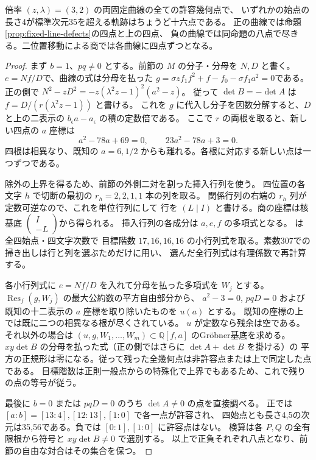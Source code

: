 \begin{theorem}\label{thm:fixed-geometric-quartic}
倍率 $(z,\lambda)=(3,2)$ の両固定曲線の全ての許容幾何点で、
いずれかの始点の長さ4が標準次元35を超える軌跡はちょうど十六点である。
正の曲線では命題\ref{prop:fixed-line-defects}の四点と上の四点、
負の曲線では同命題の八点で尽きる。二位置移動による商では各曲線に四点ずつとなる。
\end{theorem}
\begin{proof}
まず $b=1$、$pq\ne0$ とする。前節の $M$ の分子・分母を $N,D$ と書く。
$e=Nf/D$で、曲線の式は分母を払った
$g=\sigma z f_1 f^2+f-f_0-\sigma f_1 a^2=0$である。
正の側で $N^2-zD^2=-z(\lambda^2z-1)^2(a^2-z)$。
従って $\det B=-\det A$ は $f=D/(r(\lambda^2 z-1))$ と書ける。
これを $g$ に代入し分子を因数分解すると、$D$ と上の二表示の
$b_\epsilon a-a_\epsilon$ の積の定数倍である。
ここで $r$ の両根を取ると、新しい四点の $a$ 座標は
\[
 a^2-78a+69=0,\qquad 23a^2-78a+3=0.
\]
四根は相異なり、既知の $a=6,1/2$ からも離れる。各根に対応する新しい点は一つずつである。

除外の上界を得るため、前節の外側二対を割った挿入行列を使う。
四位置の各文字 $h$ で切断の最初の $r_h=2,2,1,1$ 本の列を取る。
関係行列の右端の $r_h$ 列が定数可逆なので、これを単位行列にして
行を $(L\mid I)$ と書ける。商の座標は核基底 $\left(\begin{smallmatrix}I\\-L\end{smallmatrix}\right)$から得られる。
挿入行列の各成分は $a,e,f$ の多項式となる。
 は全四始点・四文字次数で
目標階数 $17,16,16,16$ の小行列式を取る。素数307での掃き出しは行と列を選ぶためだけに用い、
選んだ全行列式は有理係数で再計算する。

各小行列式に $e=Nf/D$ を入れて分母を払った多項式を $W_j$ とする。
$\operatorname{Res}_f(g,W_j)$ の最大公約数の平方自由部分から、
$a^2-3=0$, $pqD=0$ および既知の十二表示の $a$ 座標を取り除いたものを $u(a)$ とする。
既知の座標の上では既に二つの相異なる根が尽くされている。
$u$ が定数なら残余は空である。それ以外の場合は
$(u,g,W_1,\ldots,W_m)\subset\mathbb Q[f,a]$ のGröbner基底を求める。
$xy\det B$ の分母を払った式（正の側ではさらに $\det A+\det B$ を掛ける）の
平方の正規形は零になる。従って残った全幾何点は非許容点または上で同定した点である。
目標階数は正則一般点からの特殊化で上界でもあるため、これで残りの点の等号が従う。

最後に $b=0$ または $pqD=0$ のうち $\det A\ne0$ の点を直接調べる。
正では $[a:b]=[13:4],[12:13],[1:0]$ で各一点が許容され、
四始点とも長さ4,5の次元は35,56である。負では $[0:1],[1:0]$ に許容点はない。
検算は各 $P,Q$ の全有限根から符号と $xy\det B\ne0$ で選別する。
以上で正負それぞれ八点となり、前節の自由な対合はその集合を保つ。
\end{proof}
